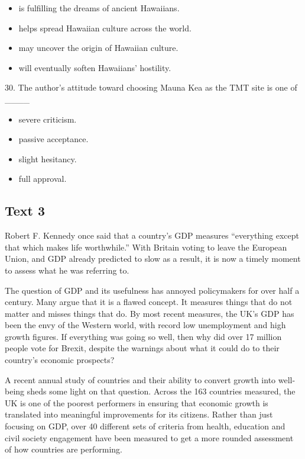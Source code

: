 \documentclass[UTF8,11pt]{ctexart}
\begin{document}
\begin{itemize}[leftmargin=2em,itemsep=.2em,topsep=.4em]\item[A.] is fulfilling the dreams of ancient Hawaiians.
\item[B.] helps spread Hawaiian culture across the world.
\item[C.] may uncover the origin of Hawaiian culture.
\item[D.] will eventually soften Hawaiians’ hostility.
\end{itemize}

30. The author’s attitude toward choosing Mauna Kea as the TMT site is one of \_\_\_\_


\begin{itemize}[leftmargin=2em,itemsep=.2em,topsep=.4em]\item[A.] severe criticism.
\item[B.] passive acceptance.
\item[C.] slight hesitancy.
\item[D.] full approval.
\end{itemize}

\subsection*{\textbf{Text 3}}


Robert F. Kennedy once said that a country’s GDP measures “everything except that which makes life worthwhile.” With Britain voting to leave the European Union, and GDP already predicted to slow as a result, it is now a timely moment to assess what he was referring to.


The question of GDP and its usefulness has annoyed policymakers for over half a century. Many argue that it is a flawed concept. It measures things that do not matter and misses things that do. By most recent measures, the UK’s GDP has been the envy of the Western world, with record low unemployment and high growth figures. If everything was going so well, then why did over 17 million people vote for Brexit, despite the warnings about what it could do to their country’s economic prospects?


A recent annual study of countries and their ability to convert growth into well-being sheds some light on that question. Across the 163 countries measured, the UK is one of the poorest performers in ensuring that economic growth is translated into meaningful improvements for its citizens. Rather than just focusing on GDP, over 40 different sets of criteria from health, education and civil society engagement have been measured to get a more rounded assessment of how countries are performing.
\end{document}
